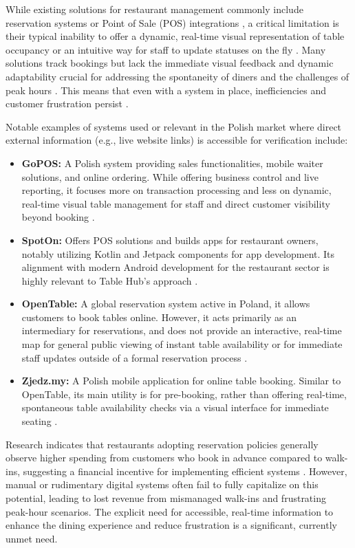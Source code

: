 \documentclass{article}
\begin{document}
While existing solutions for restaurant management commonly include reservation systems or Point of Sale (POS) integrations \parencite{skakun2024restaurant}, a critical limitation is their typical inability to offer a dynamic, real-time visual representation of table occupancy or an intuitive way for staff to update statuses on the fly \parencite{skakun2024restaurant}. Many solutions track bookings but lack the immediate visual feedback and dynamic adaptability crucial for addressing the spontaneity of diners and the challenges of peak hours \parencite{skakun2024restaurant}. This means that even with a system in place, inefficiencies and customer frustration persist \parencite{skakun2024restaurant}.

Notable examples of systems used or relevant in the Polish market where direct external information (e.g., live website links) is accessible for verification include:
\begin{itemize}
    \item \textbf{GoPOS:} A Polish system providing sales functionalities, mobile waiter solutions, and online ordering. While offering business control and live reporting, it focuses more on transaction processing and less on dynamic, real-time visual table management for staff and direct customer visibility beyond booking \parencite{gopos}.
    \item \textbf{SpotOn:} Offers POS solutions and builds apps for restaurant owners, notably utilizing Kotlin and Jetpack components for app development. Its alignment with modern Android development for the restaurant sector is highly relevant to Table Hub's approach \parencite{spoton}.
    \item \textbf{OpenTable:} A global reservation system active in Poland, it allows customers to book tables online. However, it acts primarily as an intermediary for reservations, and does not provide an interactive, real-time map for general public viewing of instant table availability or for immediate staff updates outside of a formal reservation process \parencite{opentable}.
    \item \textbf{Zjedz.my:} A Polish mobile application for online table booking. Similar to OpenTable, its main utility is for pre-booking, rather than offering real-time, spontaneous table availability checks via a visual interface for immediate seating \parencite{zjedzmy}.
\end{itemize}

Research indicates that restaurants adopting reservation policies generally observe higher spending from customers who book in advance compared to walk-ins, suggesting a financial incentive for implementing efficient systems \parencite{gregorash2016restaurant}. However, manual or rudimentary digital systems often fail to fully capitalize on this potential, leading to lost revenue from mismanaged walk-ins and frustrating peak-hour scenarios. The explicit need for accessible, real-time information to enhance the dining experience and reduce frustration is a significant, currently unmet need.
\end{document}

